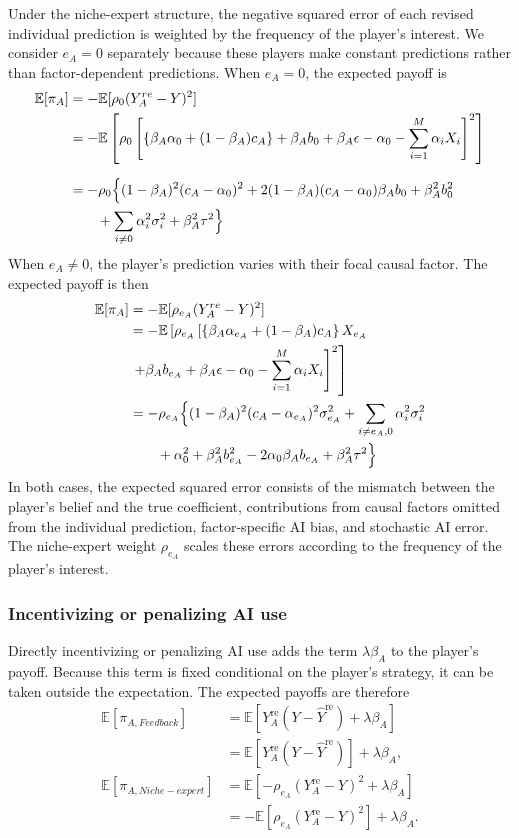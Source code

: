 \documentclass[12pt]{article}
\begin{document}
Under the niche-expert structure, the negative squared error of each revised individual prediction is weighted by the frequency of the player's interest. 
We consider $e_A=0$ separately because these players make constant predictions rather than factor-dependent predictions. 
When $e_A=0$, the expected payoff is
\begin{align}
\mathbb{E}[\pi_A]
&= -\mathbb{E}[\rho_{0}(Y_A^{re} - Y)^2] \\
&= -\mathbb{E}\left[\rho_{0}\left[\left\{\beta_A\alpha_0 + (1-\beta_A)c_A\right\} + \beta_Ab_0 + \beta_A\epsilon - \alpha_0 - \sum_{i = 1}^{M}\alpha_iX_i\right]^2\right] \\[6pt]
&= -\rho_{0}\Bigl\{(1-\beta_A)^2(c_A - \alpha_0)^2 + 2(1-\beta_A)(c_A - \alpha_0)\beta_Ab_0 + \beta_A^2 b_0^2 \\
&\qquad + \sum_{i \neq 0}\alpha_i^2\sigma_i^2 + \beta_A^2\tau^2\Bigr\}
\end{align}
When $e_A\neq0$, the player's prediction varies with their focal causal factor. The expected payoff is then
\begin{align}
\mathbb{E}[\pi_A]
&= -\mathbb{E}[\rho_{e_A}(Y_A^{re} - Y)^2] \\
&= -\mathbb{E}\left[\rho_{e_A}\left[\left\{\beta_A\alpha_{e_A} + (1-\beta_A)c_A\right\} X_{e_A}\right.\right.\\
&\left.\left.+ \beta_Ab_{e_A} + \beta_A\epsilon - \alpha_0 - \sum_{i = 1}^{M}\alpha_iX_i\right]^2\right] \\
&= -\rho_{e_A}\Bigl\{(1-\beta_A)^2(c_A - \alpha_{e_A})^2\sigma_{e_A}^2 + \sum_{i \neq e_A, 0}\alpha_i^2\sigma_i^2 \\
&\qquad + \alpha_0^2 + \beta_A^2 b_{e_A}^2 - 2\alpha_0\beta_Ab_{e_A} + \beta_A^2\tau^2\Bigr\}
\end{align}
In both cases, the expected squared error consists of the mismatch between the player's belief and the true coefficient, contributions from causal factors omitted from the individual prediction, factor-specific AI bias, and stochastic AI error. 
The niche-expert weight $\rho_{e_A}$ scales these errors according to the frequency of the player's interest.

\subsubsection*{Incentivizing or penalizing AI use}

Directly incentivizing or penalizing AI use adds the term $\lambda\beta_A$ to the player's payoff. Because this term is fixed conditional on the player's strategy, it can be taken outside the expectation. The expected payoffs are therefore
\begin{align}
\mathbb{E}[\pi_{A, Feedback}] &=\mathbb{E}\left[Y_A^{\mathrm{re}}(Y-\hat{Y}^{\mathrm{re}}) + \lambda\beta_A\right]\\
&= \mathbb{E}\left[Y_A^{\mathrm{re}}(Y-\hat{Y}^{\mathrm{re}})\right] + \lambda\beta_A,\\
\mathbb{E}[\pi_{A, Niche-expert}] &= \mathbb{E}\left[-\rho_{e_A}(Y_A^{\mathrm{re}}-Y)^2 + \lambda\beta_A\right] \\
&= -\mathbb{E}\left[\rho_{e_A}(Y_A^{\mathrm{re}}-Y)^2\right] + \lambda\beta_A.
\end{align}
\end{document}
